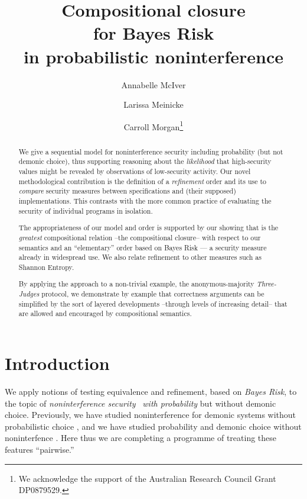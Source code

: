 \documentclass[runningheads]{llncs}
\begin{document}
\title{Compositional closure \\
for Bayes Risk \\
in probabilistic noninterference}
\author{Annabelle McIver \and Larissa Meinicke \and Carroll Morgan\thanks{We acknowledge the support of the Australian Research Council Grant {DP0879529}.}}
\maketitle

\begin{abstract}
We give a sequential model for noninterference security including probability (but not demonic choice), thus supporting reasoning about the \emph{likelihood} that high-security values might be revealed by observations of low-security activity. Our novel methodological contribution is the definition of a \emph{refinement} order  and its use to \emph{compare} security measures between specifications and (their supposed) implementations. This contrasts with the more common practice of evaluating the security of individual programs in isolation.

\medskip
The appropriateness of our model and order is supported by our showing that  is the \emph{greatest} compositional relation --the compositional closure-- with respect to our semantics and an ``elementary'' order based on Bayes Risk --- a security measure already in widespread use. We also relate refinement to other measures such as Shannon Entropy.

\medskip
By applying the approach to a non-trivial example, the anonymous-majority \emph{Three-Judges} protocol, we demonstrate by example that correctness arguments can be simplified by the sort of layered developments --through levels of increasing detail-- that are allowed and encouraged by compositional semantics.
\end{abstract}

\tableofcontents

\newpage
\section{Introduction}
We apply notions of testing equivalence and refinement, based on \emph{Bayes Risk}, to the topic of \emph{noninterference security}~\cite{Goguen:84} \emph{with probability} but without demonic choice. Previously, we have studied noninterference for demonic systems without probabilistic choice \cite{Morgan:06,Morgan:07}, and we have studied probability and demonic choice without noninterfence \cite{Morgan:96d,McIver:05a}. Here thus we are completing a programme of treating these features ``pairwise.''
\end{document}
